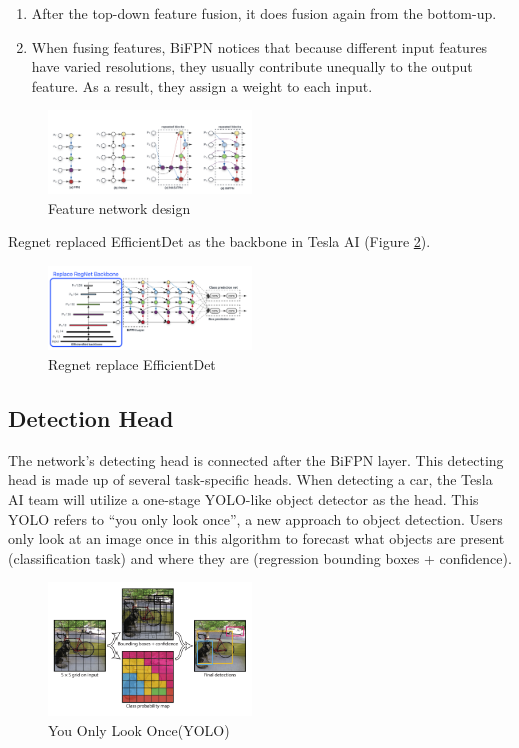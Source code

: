 \documentclass[letterpaper, 10 pt, conference]{ieeeconf}  %
\begin{document}
\begin{enumerate}
    \item After the top-down feature fusion, it does fusion again from the bottom-up.
    \item When fusing features, BiFPN notices that because different input features have varied resolutions, they usually contribute unequally to the output feature. As a result, they assign a weight to each input\cite{Tan_2020_CVPR}.
\end{enumerate}

\begin{figure}[hbt!]
\centering
\includegraphics[width=0.48\textwidth]{gfx/BiFPN.png}
\caption{Feature network design}
\label{bifpn}
\end{figure}

Regnet replaced EfficientDet as the backbone in Tesla AI (Figure \ref{bifpn_tesla}).

\begin{figure}[hbt!]
\centering
\includegraphics[width=0.48\textwidth]{gfx/bifpn_tesla.png}
\caption{Regnet replace EfficientDet}
\label{bifpn_tesla}
\end{figure}

\subsection{Detection Head}
The network's detecting head is connected after the BiFPN layer. This detecting head is made up of several task-specific heads. When detecting a car, the Tesla AI team will utilize a one-stage YOLO-like object detector as the head. This YOLO refers to “you only look once”, a new approach to object detection. Users only look at an image once in this algorithm to forecast what objects are present (classification task) and where they are (regression bounding boxes + confidence)\cite{Redmon_2016_CVPR}.

\begin{figure}[hbt!]
\centering
\includegraphics[width=0.48\textwidth]{gfx/yolo.png}
\caption{You Only Look Once(YOLO)}
\label{yolo}
\end{figure}
\end{document}
